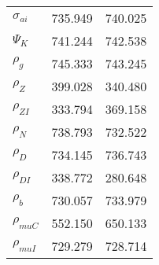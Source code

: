 \begin{center}
\begin{longtable}{lcc}
$ {\sigma_{ai}}        $	 & 	     735.949	 & 	     740.025 \\ 
$ {\Psi_{K}}           $	 & 	     741.244	 & 	     742.538 \\ 
$ {\rho_g}             $	 & 	     745.333	 & 	     743.245 \\ 
$ {\rho_Z}             $	 & 	     399.028	 & 	     340.480 \\ 
$ {\rho_{ZI}}          $	 & 	     333.794	 & 	     369.158 \\ 
$ {\rho_N}             $	 & 	     738.793	 & 	     732.522 \\ 
$ {\rho_D}             $	 & 	     734.145	 & 	     736.743 \\ 
$ {\rho_{DI}}          $	 & 	     338.772	 & 	     280.648 \\ 
$ {\rho_b}             $	 & 	     730.057	 & 	     733.979 \\ 
$ {\rho_{muC}}         $	 & 	     552.150	 & 	     650.133 \\ 
$ {\rho_{muI}}         $	 & 	     729.279	 & 	     728.714 \\ 
\end{longtable}
 \end{center}
